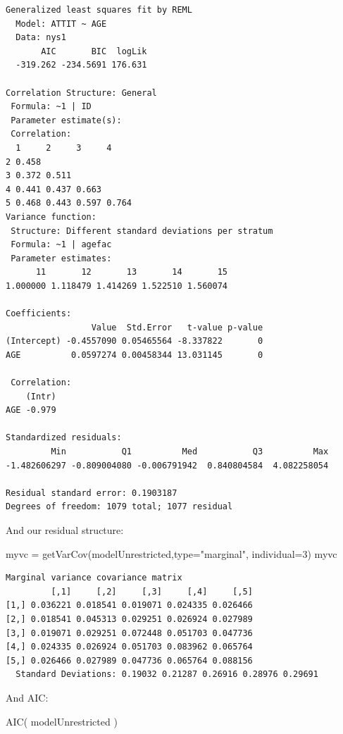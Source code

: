 \documentclass[
  letterpaper,
  DIV=11,
  numbers=noendperiod]{scrreprt}
\newenvironment{Shaded}{}{}
\newcommand{\AttributeTok}[1]{\textcolor[rgb]{0.49,0.56,0.16}{#1}}
\newcommand{\DecValTok}[1]{\textcolor[rgb]{0.25,0.63,0.44}{#1}}
\newcommand{\FunctionTok}[1]{\textcolor[rgb]{0.02,0.16,0.49}{#1}}
\newcommand{\NormalTok}[1]{#1}
\newcommand{\OtherTok}[1]{\textcolor[rgb]{0.00,0.44,0.13}{#1}}
\newcommand{\StringTok}[1]{\textcolor[rgb]{0.25,0.44,0.63}{#1}}
\begin{document}
\begin{verbatim}
Generalized least squares fit by REML
  Model: ATTIT ~ AGE 
  Data: nys1 
       AIC       BIC  logLik
  -319.262 -234.5691 176.631

Correlation Structure: General
 Formula: ~1 | ID 
 Parameter estimate(s):
 Correlation: 
  1     2     3     4    
2 0.458                  
3 0.372 0.511            
4 0.441 0.437 0.663      
5 0.468 0.443 0.597 0.764
Variance function:
 Structure: Different standard deviations per stratum
 Formula: ~1 | agefac 
 Parameter estimates:
      11       12       13       14       15 
1.000000 1.118479 1.414269 1.522510 1.560074 

Coefficients:
                 Value  Std.Error   t-value p-value
(Intercept) -0.4557090 0.05465564 -8.337822       0
AGE          0.0597274 0.00458344 13.031145       0

 Correlation: 
    (Intr)
AGE -0.979

Standardized residuals:
         Min           Q1          Med           Q3          Max 
-1.482606297 -0.809004080 -0.006791942  0.840804584  4.082258054 

Residual standard error: 0.1903187 
Degrees of freedom: 1079 total; 1077 residual
\end{verbatim}

And our residual structure:

\begin{Shaded}
\begin{Highlighting}[]
\NormalTok{myvc }\OtherTok{=} \FunctionTok{getVarCov}\NormalTok{(modelUnrestricted,}\AttributeTok{type=}\StringTok{"marginal"}\NormalTok{, }\AttributeTok{individual=}\DecValTok{3}\NormalTok{)}
\NormalTok{myvc}
\end{Highlighting}
\end{Shaded}

\begin{verbatim}
Marginal variance covariance matrix
         [,1]     [,2]     [,3]     [,4]     [,5]
[1,] 0.036221 0.018541 0.019071 0.024335 0.026466
[2,] 0.018541 0.045313 0.029251 0.026924 0.027989
[3,] 0.019071 0.029251 0.072448 0.051703 0.047736
[4,] 0.024335 0.026924 0.051703 0.083962 0.065764
[5,] 0.026466 0.027989 0.047736 0.065764 0.088156
  Standard Deviations: 0.19032 0.21287 0.26916 0.28976 0.29691 
\end{verbatim}

And AIC:

\begin{Shaded}
\begin{Highlighting}[]
\FunctionTok{AIC}\NormalTok{( modelUnrestricted )}
\end{Highlighting}
\end{Shaded}
\end{document}
